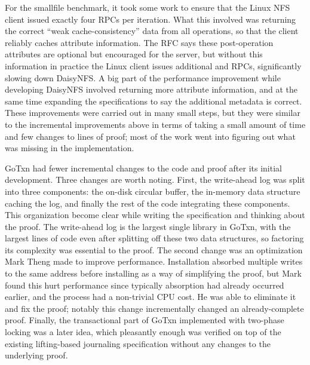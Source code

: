 For the smallfile benchmark, it took some work to ensure that the Linux NFS
client issued exactly four RPCs per iteration. What this involved was returning
the correct ``weak cache-consistency'' data from all operations, so that the
client reliably caches attribute information. The RFC says these post-operation
attributes are optional but encouraged for the server, but without this
information in practice the Linux client issues additional  and
 RPCs, significantly slowing down DaisyNFS. A big part of the
performance improvement while developing DaisyNFS involved returning more
attribute information, and at the same time expanding the specifications to say
the additional metadata is correct. These improvements were carried out in many
small steps, but they were similar to the incremental improvements above in
terms of taking a small amount of time and few changes to lines of proof; most
of the work went into figuring out what was missing in the implementation.

GoTxn had fewer incremental changes to the code and proof after its initial
development. Three changes are worth noting. First, the write-ahead log was
split into three components: the on-disk circular buffer, the in-memory data
structure caching the log, and finally the rest of the code integrating these
components. This organization become clear while writing the specification and
thinking about the proof. The write-ahead log is the largest single library in
GoTxn, with the largest lines of code even after splitting off these two data
structures, so factoring its complexity was essential to the proof. The second
change was an optimization Mark Theng made to improve performance. Installation
absorbed multiple writes to the same address before installing as a way of
simplifying the proof, but Mark found this hurt performance since typically absorption had already occurred earlier, and the process had a non-trivial CPU cost. He was able to
eliminate it and fix the proof; notably this change incrementally changed an
already-complete proof. Finally, the transactional part of GoTxn implemented
with two-phase locking was a later idea,
which pleasantly enough was verified on top of the existing lifting-based
journaling specification without any changes to the underlying proof.


